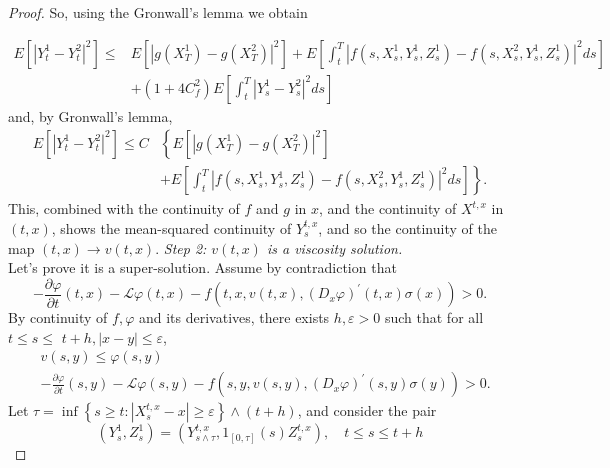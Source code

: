 \begin{proof}
So, using the Gronwall's lemma we obtain

\begin{equation}
	\begin{aligned}
		E\left[\left|Y_t^1-Y_t^2\right|^2\right] \leq & E\left[\left|g\left(X_T^1\right)-g\left(X_T^2\right)\right|^2\right]+E\left[\int_t^T\left|f\left(s, X_s^1, Y_s^1, Z_s^1\right)-f\left(s, X_s^2, Y_s^1, Z_s^1\right)\right|^2 d s\right] \\
		& +\left(1+4 C_f^2\right) E\left[\int_t^T\left|Y_s^1-Y_s^2\right|^2 d s\right]
	\end{aligned}
\end{equation}
and, by Gronwall's lemma,
\begin{equation}
	\begin{aligned}
		E\left[\left|Y_t^1-Y_t^2\right|^2\right] \leq C & \left\{E\left[\left|g\left(X_T^1\right)-g\left(X_T^2\right)\right|^2\right]\right. \\
		& \left.+E\left[\int_t^T\left|f\left(s, X_s^1, Y_s^1, Z_s^1\right)-f\left(s, X_s^2, Y_s^1, Z_s^1\right)\right|^2 d s\right]\right\} .
	\end{aligned}
\end{equation}
This, combined with the continuity of $f$ and $g$ in $x$, and the continuity of $X^{t,x}$ in $(t,x)$, shows the mean-squared continuity of $Y_{s}^{t,x}$, and so the continuity of the map $(t,x)\to v(t,x)$.
\textit{Step 2: $v(t,x)$ is a viscosity solution.}\\
Let's prove it is a super-solution. Assume by contradiction that
\begin{equation}
	-\frac{\partial \varphi}{\partial t}(t, x)-\mathcal{L} \varphi(t, x)-f\left(t, x, v(t, x),\left(D_x \varphi\right)^{\prime}(t, x) \sigma(x)\right)>0.
\end{equation}
By continuity of $f, \varphi$ and its derivatives, there exists $h, \varepsilon>0$ such that for all $t \leq s \leq$ $t+h,|x-y| \leq \varepsilon$,
$$
\begin{aligned}
	\label{eqn:618}
	& v(s, y) \leq \varphi(s, y) \\
	&-\frac{\partial \varphi}{\partial t}(s, y)-\mathcal{L} \varphi(s, y)-f\left(s, y, v(s, y),\left(D_x \varphi\right)^{\prime}(s, y) \sigma(y)\right)>0 .
\end{aligned}
$$
Let $\tau=\inf \left\{s \geq t:\left|X_s^{t, x}-x\right| \geq \varepsilon\right\} \wedge(t+h)$, and consider the pair
$$
\left(Y_s^1, Z_s^1\right)=\left(Y_{s \wedge \tau}^{t, x}, 1_{[0, \tau]}(s) Z_s^{t, x}\right), \quad t \leq s \leq t+h
$$
\end{proof}
